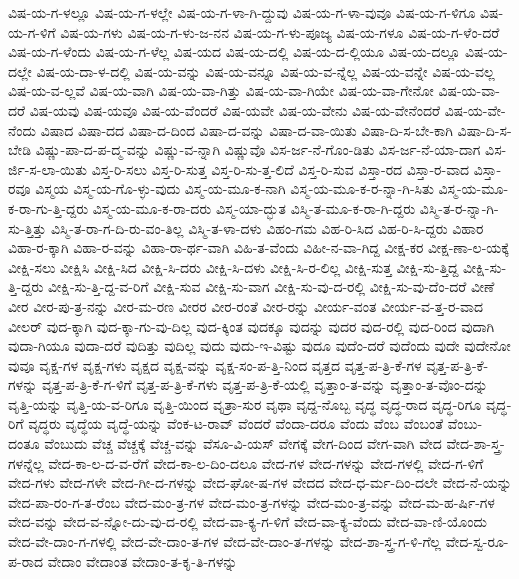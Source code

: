 {ವಿಷ-ಯ-ಗ-ಳಲ್ಲೂ
ವಿಷ-ಯ-ಗ-ಳಲ್ಲೇ
ವಿಷ-ಯ-ಗ-ಳಾ-ಗಿ-ದ್ದುವು
ವಿಷ-ಯ-ಗ-ಳಾ-ವುವೂ
ವಿಷ-ಯ-ಗ-ಳಿಗೂ
ವಿಷ-ಯ-ಗ-ಳಿಗೆ
ವಿಷ-ಯ-ಗಳು
ವಿಷ-ಯ-ಗ-ಳು-ಜ-ನನ
ವಿಷ-ಯ-ಗ-ಳು-ಪೂಜ್ಯ
ವಿಷ-ಯ-ಗಳೂ
ವಿಷ-ಯ-ಗ-ಳೆಂ-ದರೆ
ವಿಷ-ಯ-ಗ-ಳೆಂದು
ವಿಷ-ಯ-ಗ-ಳೆಲ್ಲ
ವಿಷ-ಯದ
ವಿಷ-ಯ-ದಲ್ಲಿ
ವಿಷ-ಯ-ದ-ಲ್ಲಿಯೂ
ವಿಷ-ಯ-ದಲ್ಲೂ
ವಿಷ-ಯ-ದಲ್ಲೇ
ವಿಷ-ಯ-ದಾ-ಳ-ದಲ್ಲಿ
ವಿಷ-ಯ-ವನ್ನು
ವಿಷ-ಯ-ವನ್ನೂ
ವಿಷ-ಯ-ವ-ನ್ನೆಲ್ಲ
ವಿಷ-ಯ-ವನ್ನೇ
ವಿಷ-ಯ-ವಲ್ಲ
ವಿಷ-ಯ-ವ-ಲ್ಲವೆ
ವಿಷ-ಯ-ವಾಗಿ
ವಿಷ-ಯ-ವಾ-ಗಿತ್ತು
ವಿಷ-ಯ-ವಾ-ಗಿಯೇ
ವಿಷ-ಯ-ವಾ-ಗೇನೋ
ವಿಷ-ಯ-ವಾ-ದರೆ
ವಿಷ-ಯವು
ವಿಷ-ಯವೂ
ವಿಷ-ಯ-ವೆಂದರೆ
ವಿಷ-ಯವೇ
ವಿಷ-ಯ-ವೇನು
ವಿಷ-ಯ-ವೇನೆಂದರೆ
ವಿಷ-ಯ-ವೇ-ನೆಂದು
ವಿಷಾದ
ವಿಷಾ-ದದ
ವಿಷಾ-ದ-ದಿಂದ
ವಿಷಾ-ದ-ವನ್ನು
ವಿಷಾ-ದ-ವಾ-ಯಿತು
ವಿಷಾ-ದಿ-ಸ-ಬೇ-ಕಾಗಿ
ವಿಷಾ-ದಿ-ಸ-ಬೇಡಿ
ವಿಷ್ಣು-ಪಾ-ದ-ಪ-ದ್ಮ-ವನ್ನು
ವಿಷ್ಣು-ವ-ನ್ನಾಗಿ
ವಿಷ್ಣುವೊ
ವಿಸ-ರ್ಜ-ನೆ-ಗೊಂ-ಡಿತು
ವಿಸ-ರ್ಜ-ನೆ-ಯಾ-ದಾಗ
ವಿಸ-ರ್ಜಿ-ಸ-ಲಾ-ಯಿತು
ವಿಸ್ತ-ರಿ-ಸಲು
ವಿಸ್ತ-ರಿ-ಸುತ್ತ
ವಿಸ್ತ-ರಿ-ಸು-ತ್ತ-ಲಿದೆ
ವಿಸ್ತ-ರಿ-ಸುವ
ವಿಸ್ತಾ-ರದ
ವಿಸ್ತಾ-ರ-ವಾದ
ವಿಸ್ತಾ-ರವೂ
ವಿಸ್ಮಯ
ವಿಸ್ಮ-ಯ-ಗೊ-ಳ್ಳು-ವುದು
ವಿಸ್ಮ-ಯ-ಮೂ-ಕ-ನಾಗಿ
ವಿಸ್ಮ-ಯ-ಮೂ-ಕ-ರ-ನ್ನಾ-ಗಿ-ಸಿತು
ವಿಸ್ಮ-ಯ-ಮೂ-ಕ-ರಾ-ಗು-ತ್ತಿ-ದ್ದರು
ವಿಸ್ಮ-ಯ-ಮೂ-ಕ-ರಾ-ದರು
ವಿಸ್ಮ-ಯಾ-ದ್ಭುತ
ವಿಸ್ಮಿ-ತ-ಮೂ-ಕ-ರಾ-ಗಿ-ದ್ದರು
ವಿಸ್ಮಿ-ತ-ರ-ನ್ನಾ-ಗಿ-ಸು-ತ್ತಿತ್ತು
ವಿಸ್ಮಿ-ತ-ರಾ-ಗ-ದಿ-ರು-ವಂ-ತಿಲ್ಲ
ವಿಸ್ಮಿ-ತ-ಳಾ-ದಳು
ವಿಹಂ-ಗಮ
ವಿಹ-ರಿ-ಸಿದ
ವಿಹ-ರಿ-ಸಿ-ದ್ದರು
ವಿಹಾರ
ವಿಹಾ-ರ-ಕ್ಕಾಗಿ
ವಿಹಾ-ರ-ವನ್ನು
ವಿಹಾ-ರಾ-ರ್ಥ-ವಾಗಿ
ವಿಹಿ-ತ-ವೆಂದು
ವಿಹೀ-ನ-ವಾ-ಗಿದ್ದ
ವೀಕ್ಷ-ಕರ
ವೀಕ್ಷ-ಣಾ-ಲ-ಯಕ್ಕೆ
ವೀಕ್ಷಿ-ಸಲು
ವೀಕ್ಷಿಸಿ
ವೀಕ್ಷಿ-ಸಿದ
ವೀಕ್ಷಿ-ಸಿ-ದರು
ವೀಕ್ಷಿ-ಸಿ-ದಳು
ವೀಕ್ಷಿ-ಸಿ-ರ-ಲಿಲ್ಲ
ವೀಕ್ಷಿ-ಸುತ್ತ
ವೀಕ್ಷಿ-ಸು-ತ್ತಿದ್ದ
ವೀಕ್ಷಿ-ಸು-ತ್ತಿ-ದ್ದರು
ವೀಕ್ಷಿ-ಸು-ತ್ತಿ-ದ್ದ-ವ-ರಿಗೆ
ವೀಕ್ಷಿ-ಸುವ
ವೀಕ್ಷಿ-ಸು-ವಾಗ
ವೀಕ್ಷಿ-ಸು-ವು-ದ-ರಲ್ಲಿ
ವೀಕ್ಷಿ-ಸು-ವು-ದೆಂ-ದರೆ
ವೀಣೆ
ವೀರ
ವೀರ-ಪು-ತ್ರ-ನನ್ನು
ವೀರ-ಮ-ರಣ
ವೀರರ
ವೀರ-ರಂತೆ
ವೀರ-ರನ್ನು
ವೀರ್ಯ-ವಂತ
ವೀರ್ಯ-ವ-ತ್ತ-ರ-ವಾದ
ವೀಲರ್
ವುದ-ಕ್ಕಾಗಿ
ವುದ-ಕ್ಕಾ-ಗು-ವು-ದಿಲ್ಲ
ವುದ-ಕ್ಕಿಂತ
ವುದಕ್ಕೂ
ವುದನ್ನು
ವುದರ
ವುದ-ರಲ್ಲಿ
ವುದ-ರಿಂದ
ವುದಾಗಿ
ವುದಾ-ಗಿಯೂ
ವುದಾ-ದರೆ
ವುದಿತ್ತು
ವುದಿಲ್ಲ
ವುದು
ವುದು-ಇ-ವಿಷ್ಟು
ವುದೂ
ವುದೆಂ-ದರೆ
ವುದೆಂದು
ವುದೇ
ವುದೇನೋ
ವುವೂ
ವೃಕ್ಷ-ಗಳ
ವೃಕ್ಷ-ಗಳು
ವೃಕ್ಷದ
ವೃಕ್ಷ-ವನ್ನು
ವೃಕ್ಷ-ಸಂ-ಪ-ತ್ತಿ-ನಿಂದ
ವೃತ್ತದ
ವೃತ್ತ-ಪ-ತ್ರಿ-ಕೆ-ಗಳ
ವೃತ್ತ-ಪ-ತ್ರಿ-ಕೆ-ಗಳನ್ನು
ವೃತ್ತ-ಪ-ತ್ರಿ-ಕೆ-ಗ-ಳಿಗೆ
ವೃತ್ತ-ಪ-ತ್ರಿ-ಕೆ-ಗಳು
ವೃತ್ತ-ಪ-ತ್ರಿ-ಕೆ-ಯಲ್ಲಿ
ವೃತ್ತಾಂ-ತ-ವನ್ನು
ವೃತ್ತಾಂ-ತ-ವೊಂ-ದನ್ನು
ವೃತ್ತಿ-ಯನ್ನು
ವೃತ್ತಿ-ಯ-ವ-ರಿಗೂ
ವೃತ್ತಿ-ಯಿಂದ
ವೃತ್ರಾ-ಸುರ
ವೃಥಾ
ವೃದ್ದ-ನೊಬ್ಬ
ವೃದ್ಧ
ವೃದ್ಧ-ರಾದ
ವೃದ್ಧ-ರಿಗೂ
ವೃದ್ಧ-ರಿಗೆ
ವೃದ್ಧರು
ವೃದ್ಧೆಯ
ವೃದ್ಧೆ-ಯನ್ನು
ವೆಂಕ-ಟ-ರಾವ್
ವೆಂದರೆ
ವೆಂದಾ-ದರೂ
ವೆಂದು
ವೆಂಬ
ವೆಂಬಂತೆ
ವೆಂಬು-ದಂತೂ
ವೆಂಬುದು
ವೆಚ್ಚ
ವೆಚ್ಚಕ್ಕೆ
ವೆಚ್ಚ-ವನ್ನು
ವೆಸೂ-ವಿ-ಯಸ್
ವೇಗಕ್ಕೆ
ವೇಗ-ದಿಂದ
ವೇಗ-ವಾಗಿ
ವೇದ
ವೇದ-ಶಾ-ಸ್ತ್ರ-ಗಳನ್ನೆಲ್ಲ
ವೇದ-ಕಾ-ಲ-ದ-ವ-ರೆಗೆ
ವೇದ-ಕಾ-ಲ-ದಿಂ-ದಲೂ
ವೇದ-ಗಳ
ವೇದ-ಗಳನ್ನು
ವೇದ-ಗಳಲ್ಲಿ
ವೇದ-ಗ-ಳಿಗೆ
ವೇದ-ಗಳು
ವೇದ-ಗಳೇ
ವೇದ-ಗೀ-ದ-ಗಳನ್ನು
ವೇದ-ಘೋ-ಷ-ಗಳ
ವೇದದ
ವೇದ-ಧ-ರ್ಮ-ದಿಂ-ದಲೇ
ವೇದ-ನೆ-ಯನ್ನು
ವೇದ-ಪಾ-ರಂ-ಗ-ತ-ರೆಂಬ
ವೇದ-ಮಂ-ತ್ರ-ಗಳ
ವೇದ-ಮಂ-ತ್ರ-ಗಳನ್ನು
ವೇದ-ಮಂ-ತ್ರ-ವನ್ನು
ವೇದ-ಮ-ಹ-ರ್ಷಿ-ಗಳ
ವೇದ-ವನ್ನು
ವೇದ-ವ-ನ್ನೋ-ದು-ವು-ದ-ರಲ್ಲಿ
ವೇದ-ವಾ-ಕ್ಯ-ಗ-ಳಿಗೆ
ವೇದ-ವಾ-ಕ್ಯ-ವೆಂದು
ವೇದ-ವಾ-ಣಿ-ಯೊಂದು
ವೇದ-ವೇ-ದಾಂ-ಗ-ಗಳಲ್ಲಿ
ವೇದ-ವೇ-ದಾಂ-ತ-ಗಳ
ವೇದ-ವೇ-ದಾಂ-ತ-ಗಳನ್ನು
ವೇದ-ಶಾ-ಸ್ತ್ರ-ಗ-ಳಿ-ಗೆಲ್ಲ
ವೇದ-ಸ್ವ-ರೂ-ಪ-ರಾದ
ವೇದಾಂ
ವೇದಾಂತ
ವೇದಾಂ-ತ-ಕೃ-ತಿ-ಗಳನ್ನು
}
